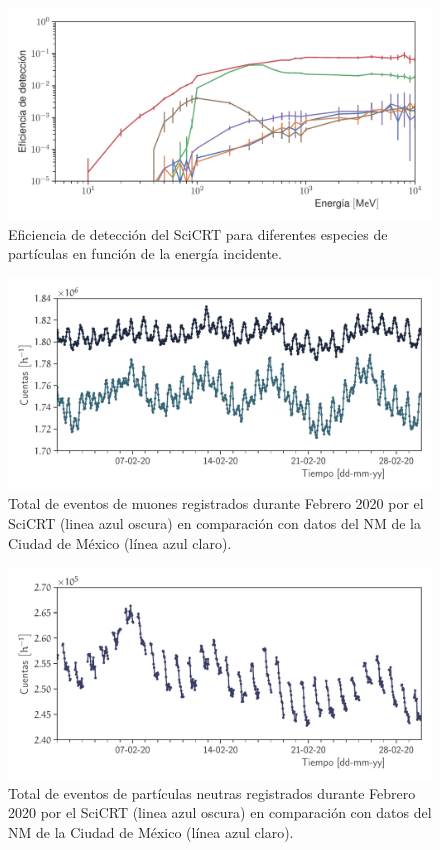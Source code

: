 \begin{figure}
        \centering
        \includegraphics[width=\textwidth]{scibar-efficiency.pdf}
        \caption{Eficiencia de detección del SciCRT para diferentes especies de partículas en función de la energía incidente.}
        \label{fig:total-efficiency}
\end{figure}



\begin{figure}
        \centering
        \includegraphics[width=\textwidth]{muon-monthly.pdf}
        \caption{Total de eventos de muones registrados durante Febrero \num{2020} por el SciCRT (linea azul oscura) en comparación con datos del NM de la Ciudad de México (línea azul claro).}
        \label{fig:muon-monthly}
\end{figure}

\begin{figure}
        \centering
        \includegraphics[width=\textwidth]{neutron-monthly.pdf}
        \caption{Total de eventos de partículas neutras registrados durante Febrero \num{2020} por el SciCRT (linea azul oscura) en comparación con datos del NM de la Ciudad de México (línea azul claro).}
        \label{fig:neutron-monthly}
\end{figure}


